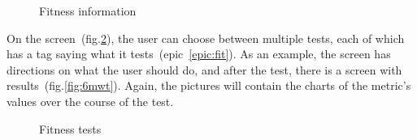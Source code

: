 \begin{figure}[h!]
    \centering
    \hfill
    \caption{Fitness information}
    \label{fig:fitnessInfo}
\end{figure}

On the  screen~(fig.\ref{fig:fitnessTests}), the user can choose between multiple tests, each of which has a tag saying what it tests~(epic~\ref{epic:fit}).
As an example, the  screen has directions on what the user should do, and after the test, there is a screen with results~(fig.\ref{fig:6mwt}).
Again, the pictures will contain the charts of the metric's values over the course of the test.

\begin{figure}[h!]
    \centering
    \hfill
    \caption{Fitness tests}
    \label{fig:fitnessTests}
\end{figure}

